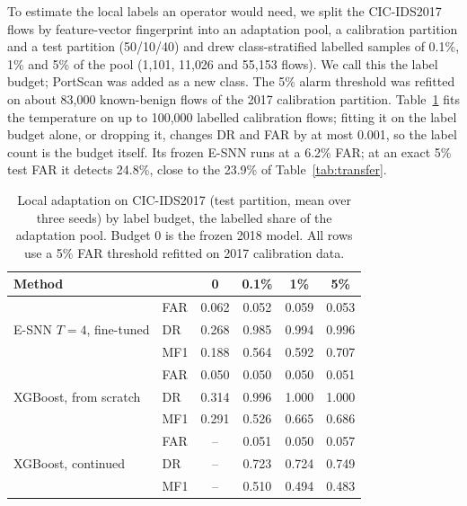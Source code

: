\documentclass[conference]{IEEEtran}
\begin{document}
To estimate the local labels an operator would need, we split the CIC-IDS2017 flows by feature-vector fingerprint into an adaptation pool, a calibration partition and a test partition (50/10/40) and drew class-stratified labelled samples of 0.1\%, 1\% and 5\% of the pool (1{,}101, 11{,}026 and 55{,}153 flows). We call this the label budget; PortScan was added as a new class. The 5\% alarm threshold was refitted on about 83{,}000 known-benign flows of the 2017 calibration partition. Table~\ref{tab:adapt} fits the temperature on up to 100{,}000 labelled calibration flows; fitting it on the label budget alone, or dropping it, changes DR and FAR by at most 0.001, so the label count is the budget itself. Its frozen E-SNN runs at a 6.2\% FAR; at an exact 5\% test FAR it detects 24.8\%, close to the 23.9\% of Table~\ref{tab:transfer}.

\begin{table}[t]
\centering
\caption{Local adaptation on CIC-IDS2017 (test partition, mean over three seeds) by label budget, the labelled share of the adaptation pool. Budget 0 is the frozen 2018 model. All rows use a 5\% FAR threshold refitted on 2017 calibration data.}
\label{tab:adapt}
\setlength{\tabcolsep}{3pt}
\begin{tabular}{llcccc}
\toprule
Method & & 0 & 0.1\% & 1\% & 5\% \\
\midrule
\multirow{3}{*}{E-SNN $T{=}4$, fine-tuned} & FAR & 0.062 & 0.052 & 0.059 & 0.053 \\
 & DR & 0.268 & 0.985 & 0.994 & 0.996 \\
 & MF1 & 0.188 & 0.564 & 0.592 & 0.707 \\
\midrule
\multirow{3}{*}{XGBoost, from scratch} & FAR & 0.050 & 0.050 & 0.050 & 0.051 \\
 & DR & 0.314 & 0.996 & 1.000 & 1.000 \\
 & MF1 & 0.291 & 0.526 & 0.665 & 0.686 \\
\midrule
\multirow{3}{*}{XGBoost, continued} & FAR & -- & 0.051 & 0.050 & 0.057 \\
 & DR & -- & 0.723 & 0.724 & 0.749 \\
 & MF1 & -- & 0.510 & 0.494 & 0.483 \\
\bottomrule
\end{tabular}
\end{table}
\end{document}
